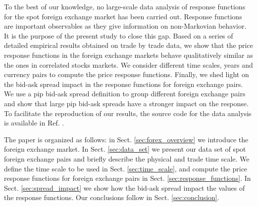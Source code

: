 To the best of our knowledge, no large-scale data analysis of response
functions for the spot foreign exchange market has been carried out. Response
functions are important observables as they give information on non-Markovian
behavior. It is the purpose of the present study to close this gap. Based on a
series of detailed empirical results obtained on trade by trade data, we show
that the price response functions in the foreign exchange markets behave
qualitatively similar as the ones in correlated stocks markets. We consider
different time scales, years and currency pairs to compute the price response
functions. Finally, we shed light on the bid-ask spread impact in the response
functions for foreign exchange pairs. We use a pip bid-ask spread definition to
group different foreign exchange pairs and show that large pip bid-ask spreads
have a stronger impact on the response. To facilitate the reproduction of our
results, the source code for the data analysis is available in Ref.
\cite{code}.

The paper is organized as follows: in Sect. \ref{sec:forex_overview} we
introduce the foreign exchange market. In Sect. \ref{sec:data_set} we present
our data set of spot foreign exchange pairs and briefly describe the physical
and trade time scale. We define the time scale to be used in Sect.
\ref{sec:time_scale}, and compute the price response functions for foreign
exchange pairs in Sect.  \ref{sec:response_functions}. In Sect.
\ref{sec:spread_impact} we show how the bid-ask spread impact the values of the
response functions. Our conclusions follow in Sect. \ref{sec:conclusion}.